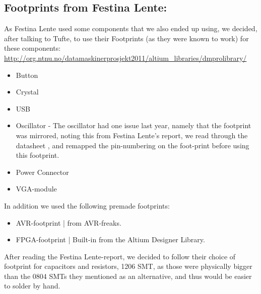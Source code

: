 \subsection{Footprints from Festina Lente:}
As Festina Lente used some components that we also ended up using, we decided,
after talking to Tufte, to use their Footprints (as they were known to work) 
for these components:
\url{http://org.ntnu.no/datamaskinerprosjekt2011/altium_libraries/dmprolibrary/}
\begin{itemize}
\item Button
\item Crystal
\item USB
\item Oscillator - The oscillator had one issue last year, namely that the
  footprint was mirrored, noting this from Festina Lente's report, we read
  through the datasheet , and remapped the
  pin-numbering on the foot-print before using this footprint.
\item Power Connector
\item VGA-module
\end{itemize}

In addition we used the following premade footprints:
\begin{itemize}
\item AVR-footprint | from AVR-freaks.
\item FPGA-footprint | Built-in from the Altium Designer Library.
\end{itemize}

After reading the Festina Lente-report, we decided to follow their
choice of footprint for capacitors and resistors, 1206 SMT, as those were physically bigger
than the 0804 SMTs they mentioned as an alternative, and thus would be easier to solder by hand.
